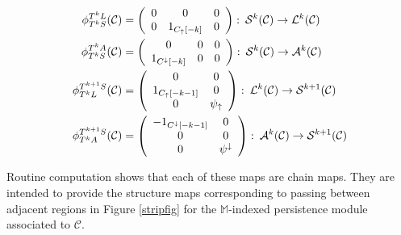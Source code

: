 \documentclass[11pt]{amsart}
\theoremstyle{definition}
\theoremstyle{remark}
\numberwithin{equation}{section}
\def\co{\colon\thinspace}
\begin{document}
\begin{align*}  \phi_{T^kS}^{T^kL}(\mathcal{C})&=\left(\begin{array}{ccc} 0 & 0 & 0 \\ 0 & 1_{C_{\uparrow}[-k]} & 0    \end{array}\right)\co \mathcal{S}^k(\mathcal{C})\to \mathcal{L}^k(\mathcal{C})   \\ \phi_{T^kS}^{T^kA}(\mathcal{C})&=\left(\begin{array}{ccc} 0 & 0 & 0 \\  1_{C^{\downarrow}[-k]} & 0 & 0    \end{array}\right)\co \mathcal{S}^k(\mathcal{C})\to \mathcal{A}^k(\mathcal{C}) \\ \phi_{T^kL}^{T^{k+1}S}(\mathcal{C}) &= \left(\begin{array}{cc} 0 & 0 \\ 1_{C_{\uparrow}[-k-1]} & 0 \\ 0 & \psi_{\uparrow}\end{array}\right) \co \mathcal{L}^{k}(\mathcal{C})\to \mathcal{S}^{k+1}(\mathcal{C})  
\\ \phi_{T^kA}^{T^{k+1}S}(\mathcal{C}) &= \left(\begin{array}{cc} -1_{C^{\downarrow}[-k-1]} & 0 \\  0 & 0 \\ 0 & \psi^{\downarrow}\end{array}\right) \co \mathcal{A}^{k}(\mathcal{C})\to \mathcal{S}^{k+1}(\mathcal{C})   	
	\end{align*} 

Routine computation shows that each of these maps are chain maps.  They are intended to provide the structure maps corresponding to passing between adjacent regions in Figure \ref{stripfig} for the $\mathbb{M}$-indexed persistence module associated to $\mathcal{C}$.   
\end{document}
